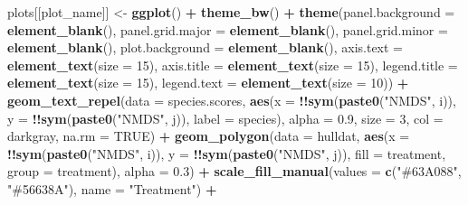 \documentclass[
]{article}
\newenvironment{Shaded}{\begin{snugshade}}{\end{snugshade}}
\newcommand{\AttributeTok}[1]{\textcolor[rgb]{0.13,0.29,0.53}{#1}}
\newcommand{\ConstantTok}[1]{\textcolor[rgb]{0.56,0.35,0.01}{#1}}
\newcommand{\DecValTok}[1]{\textcolor[rgb]{0.00,0.00,0.81}{#1}}
\newcommand{\FloatTok}[1]{\textcolor[rgb]{0.00,0.00,0.81}{#1}}
\newcommand{\FunctionTok}[1]{\textcolor[rgb]{0.13,0.29,0.53}{\textbf{#1}}}
\newcommand{\NormalTok}[1]{#1}
\newcommand{\OtherTok}[1]{\textcolor[rgb]{0.56,0.35,0.01}{#1}}
\newcommand{\SpecialCharTok}[1]{\textcolor[rgb]{0.81,0.36,0.00}{\textbf{#1}}}
\newcommand{\StringTok}[1]{\textcolor[rgb]{0.31,0.60,0.02}{#1}}
\begin{document}
\begin{Shaded}
\begin{Highlighting}[]
\NormalTok{      plots[[plot\_name]] }\OtherTok{\textless{}{-}} \FunctionTok{ggplot}\NormalTok{() }\SpecialCharTok{+}
        \FunctionTok{theme\_bw}\NormalTok{() }\SpecialCharTok{+}
        \FunctionTok{theme}\NormalTok{(}\AttributeTok{panel.background =} \FunctionTok{element\_blank}\NormalTok{(),}
              \AttributeTok{panel.grid.major =} \FunctionTok{element\_blank}\NormalTok{(),}
              \AttributeTok{panel.grid.minor =} \FunctionTok{element\_blank}\NormalTok{(),}
              \AttributeTok{plot.background =} \FunctionTok{element\_blank}\NormalTok{(),}
              \AttributeTok{axis.text =} \FunctionTok{element\_text}\NormalTok{(}\AttributeTok{size =} \DecValTok{15}\NormalTok{),}
              \AttributeTok{axis.title =} \FunctionTok{element\_text}\NormalTok{(}\AttributeTok{size =} \DecValTok{15}\NormalTok{),}
              \AttributeTok{legend.title =} \FunctionTok{element\_text}\NormalTok{(}\AttributeTok{size =} \DecValTok{15}\NormalTok{),}
              \AttributeTok{legend.text =} \FunctionTok{element\_text}\NormalTok{(}\AttributeTok{size =} \DecValTok{10}\NormalTok{)) }\SpecialCharTok{+}
        \FunctionTok{geom\_text\_repel}\NormalTok{(}\AttributeTok{data =}\NormalTok{ species.scores, }\FunctionTok{aes}\NormalTok{(}\AttributeTok{x =} \SpecialCharTok{!!}\FunctionTok{sym}\NormalTok{(}\FunctionTok{paste0}\NormalTok{(}\StringTok{"NMDS"}\NormalTok{, i)), }\AttributeTok{y =} \SpecialCharTok{!!}\FunctionTok{sym}\NormalTok{(}\FunctionTok{paste0}\NormalTok{(}\StringTok{"NMDS"}\NormalTok{, j)), }\AttributeTok{label =}\NormalTok{ species), }\AttributeTok{alpha =} \FloatTok{0.9}\NormalTok{, }\AttributeTok{size =} \DecValTok{3}\NormalTok{, }\AttributeTok{col =} \StringTok{\textquotesingle{}darkgray\textquotesingle{}}\NormalTok{, }\AttributeTok{na.rm =} \ConstantTok{TRUE}\NormalTok{) }\SpecialCharTok{+}
        \FunctionTok{geom\_polygon}\NormalTok{(}\AttributeTok{data =}\NormalTok{ hulldat, }\FunctionTok{aes}\NormalTok{(}\AttributeTok{x =} \SpecialCharTok{!!}\FunctionTok{sym}\NormalTok{(}\FunctionTok{paste0}\NormalTok{(}\StringTok{"NMDS"}\NormalTok{, i)), }\AttributeTok{y =} \SpecialCharTok{!!}\FunctionTok{sym}\NormalTok{(}\FunctionTok{paste0}\NormalTok{(}\StringTok{"NMDS"}\NormalTok{, j)), }\AttributeTok{fill =}\NormalTok{ treatment, }\AttributeTok{group =}\NormalTok{ treatment), }\AttributeTok{alpha =} \FloatTok{0.3}\NormalTok{) }\SpecialCharTok{+} 
        \FunctionTok{scale\_fill\_manual}\NormalTok{(}\AttributeTok{values =} \FunctionTok{c}\NormalTok{(}\StringTok{"\#63A088"}\NormalTok{, }\StringTok{"\#56638A"}\NormalTok{), }\AttributeTok{name =} \StringTok{"Treatment"}\NormalTok{) }\SpecialCharTok{+}

\end{Highlighting}
\end{Shaded}
\end{document}
